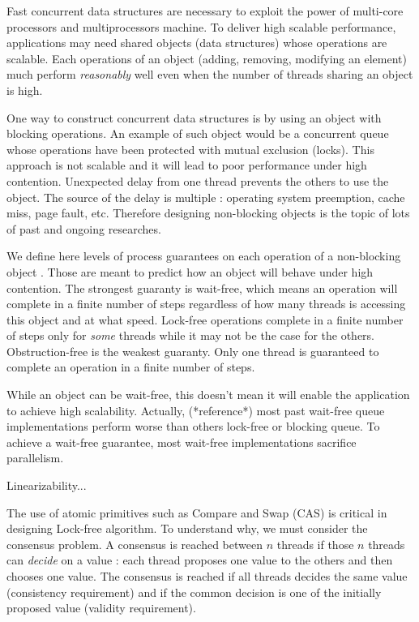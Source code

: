 Fast concurrent data structures are necessary to exploit the power of multi-core
processors and multiprocessors machine. To deliver high scalable performance,
applications may need shared objects (data structures) whose operations are
scalable. Each operations of an object (adding, removing, modifying an element)
much perform \textit{reasonably} well even when the number of threads sharing an
object is high.

One way to construct concurrent data structures is by using an object with
blocking operations. An example of such object would be a concurrent queue whose
operations have been protected with mutual exclusion (locks). This approach is
not scalable and it will lead to poor performance under high contention.
Unexpected delay from one thread prevents the others to use the object. The
source of the delay is multiple : operating system preemption, cache miss, page
fault, etc. Therefore designing non-blocking objects is the topic of lots of
past and ongoing researches.

We define here levels of process guarantees on each operation of a non-blocking
object \cite{Yang:2016:WQF:3016078.2851168}. Those are meant to predict how an
object will behave under high contention. The strongest guaranty is wait-free,
which means an operation will complete in a finite number of steps regardless of
how many threads is accessing this object and at what speed. Lock-free
operations complete in a finite number of steps only for \textit{some} threads
while it may not be the case for the others. Obstruction-free is the weakest
guaranty. Only one thread is guaranteed to complete an operation in a finite
number of steps.

While an object can be wait-free, this doesn't mean it will enable the
application to achieve high scalability. Actually, (*reference*) most past
wait-free queue implementations perform worse than others lock-free or blocking
queue. To achieve a wait-free guarantee, most wait-free implementations
sacrifice parallelism.

Linearizability...

The use of atomic primitives such as Compare and Swap (CAS) is critical in
designing Lock-free algorithm. To understand why, we must consider the consensus
problem. A consensus is reached between $n$ threads if those $n$ threads can
\textit{decide} on a value : each thread proposes one value to the others and
then chooses one value. The consensus is reached if all threads decides the same
value (consistency requirement) and if the common decision is one of the
initially proposed value (validity requirement).

